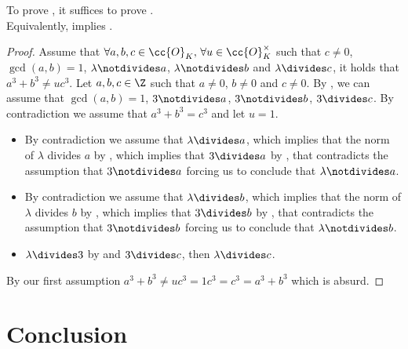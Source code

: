 \begin{lemma}
  \label{lmm:FermatLastTheoremForThree_of_FermatLastTheoremThreeGen}
  \leanok
  To prove ,
  it suffices to prove . \\
  Equivalently,  implies
  .
\end{lemma}
\begin{proof}
  \leanok
  Assume that $\forall a, b, c \in \cc{O}_K,\, \forall u \in \cc{O}^\times_K$ such that $c \neq 0$,
  $\gcd(a,b)=1$, $\lambda \notdivides a$, $\lambda \notdivides b$ and $\lambda \divides c$,
  it holds that $a^3 + b^3 \neq u c^3$.
  Let $a, b, c \in \Z$ such that $a\neq 0$, $b\neq 0$ and $c\neq 0$.
  By , we can assume that
  $\gcd(a,b)=1$, $3 \notdivides a$, $3 \notdivides b$, $3 \divides c$.
  By contradiction we assume that $a^3 + b^3 = c^3$ and let $u = 1$.
  \begin{itemize}
      \item By contradiction we assume that $\lambda \divides a$, which implies that the norm of
      $\lambda$ divides $a$ by , which implies that $3 \divides a$ by
      , that contradicts the assumption that $3 \notdivides a$ forcing us
      to conclude that $\lambda \notdivides a$.
      \item By contradiction we assume that $\lambda \divides b$, which implies that the norm of
      $\lambda$ divides $b$ by , which implies that $3 \divides b$ by
      , that contradicts the assumption that $3 \notdivides b$ forcing us
      to conclude that $\lambda \notdivides b$.
      \item $\lambda \divides 3$ by  and $3 \divides c$,
      then $\lambda \divides c$.
  \end{itemize}
  By our first assumption $a^3 + b^3 \neq u c^3 = 1 c^3 = c^3 = a^3 + b^3$ which is absurd.
\end{proof}

\section{Conclusion}

